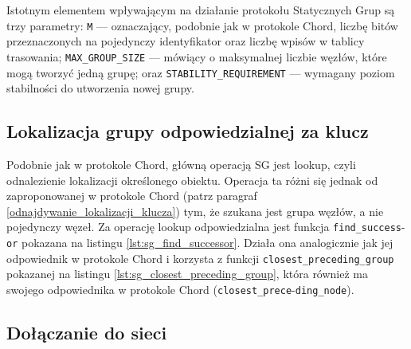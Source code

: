 \documentclass[12pt, twoside, openany]{report}
\begin{document}
Istotnym elementem wpływającym na działanie protokołu Statycznych Grup są trzy parametry: \texttt{M} --- oznaczający, podobnie jak w protokole Chord, liczbę bitów przeznaczonych na pojedynczy identyfikator oraz liczbę wpisów w tablicy trasowania; \texttt{MAX\_GROUP\_SIZE} --- mówiący o maksymalnej liczbie węzłów, które mogą tworzyć jedną grupę; oraz \texttt{STABILITY\_REQUIREMENT} --- wymagany poziom stabilności do utworzenia nowej grupy.

\subsection{Lokalizacja grupy odpowiedzialnej za klucz}

Podobnie jak w protokole Chord, główną operacją SG jest lookup, czyli odnalezienie lokalizacji określonego obiektu. Operacja ta różni się jednak od zaproponowanej w protokole Chord (patrz paragraf \ref{odnajdywanie_lokalizacji_klucza}) tym, że szukana jest grupa węzłów, a nie pojedynczy węzeł. Za operację lookup odpowiedzialna jest funkcja \texttt{find\_success}-\texttt{or} pokazana na listingu \ref{lst:sg_find_successor}. Działa ona analogicznie jak jej odpowiednik w protokole Chord i korzysta z funkcji \texttt{closest\_preceding\_group} pokazanej na listingu \ref{lst:sg_closest_preceding_group}, która również ma swojego odpowiednika w protokole Chord (\texttt{closest\_prece}-\texttt{ding\_node}).





\subsection{Dołączanie do sieci}
\end{document}
